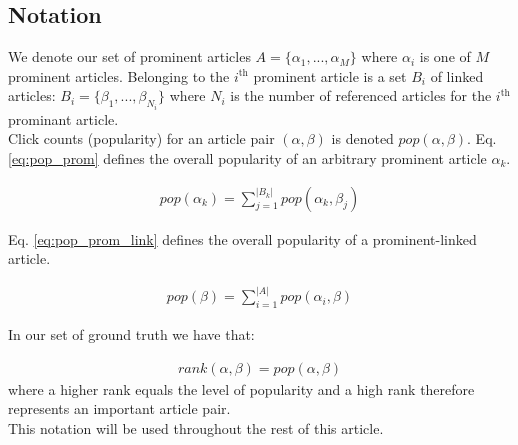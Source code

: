 \subsection{Notation}

We denote our set of prominent articles $A = \{ \alpha_1, ..., \alpha_M \}$ where $\alpha_i$ is one of $M$ prominent articles. Belonging to the $i^{\text{th}}$ prominent article is a set $B_i$ of linked articles: $B_i = \{ \beta_1, ..., \beta_{N_i} \}$ where $N_i$ is the number of referenced articles for the $i^{\text{th}}$ prominant article. \\

Click counts (popularity) for an article pair $(\alpha, \beta)$ is denoted $pop(\alpha, \beta)$. Eq. \ref{eq:pop_prom} defines the overall popularity of an arbitrary prominent article $\alpha_k$.

\begin{align}
pop(\alpha_k) = \sum\limits_{j=1}^{|B_k|} pop(\alpha_k, \beta_j)
\label{eq:pop_prom}
\end{align}

Eq. \ref{eq:pop_prom_link} defines the overall popularity of a prominent-linked article.

\begin{align}
pop(\beta) = \sum\limits_{i=1}^{|A|} pop(\alpha_i, \beta)
\label{eq:pop_prom_link}
\end{align}

In our set of ground truth we have that:

\begin{align}
rank(\alpha, \beta) = pop(\alpha, \beta)
\label{eq:pop_rank_relation_for_gt}
\end{align}
where a higher rank equals the level of popularity and a high rank therefore represents an important article pair.\\

This notation will be used throughout the rest of this article.

 \\
